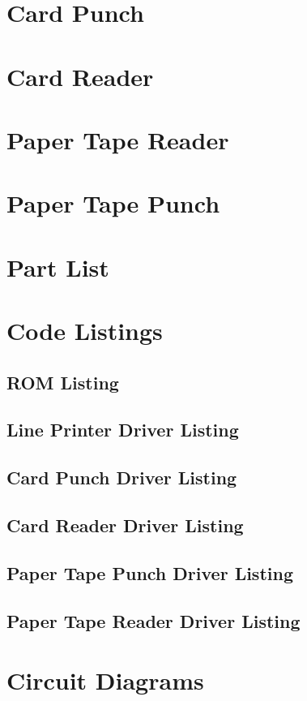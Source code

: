 \documentclass{book}
\begin{document}
\chapter{Card Punch}
\chapter{Card Reader}
\chapter{Paper Tape Reader}
\chapter{Paper Tape Punch}
\appendix
\chapter{Part List}
\chapter{Code Listings}
\lstset{numbers=left, numberstyle=\tiny, stepnumber=1, numbersep=5pt}
\section{ROM Listing}
\cleardoublepage
\section{Line Printer Driver Listing}

\cleardoublepage
\section{Card Punch Driver Listing}
\cleardoublepage
\section{Card Reader Driver Listing}
\cleardoublepage
\section{Paper Tape Punch Driver Listing}
\cleardoublepage
\section{Paper Tape Reader Driver Listing}
\chapter{Circuit Diagrams}
\end{document}
